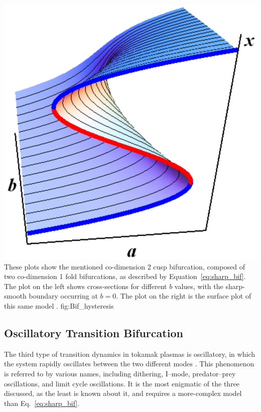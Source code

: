 	{\includegraphics[width=\textwidth]{../Graphics/Bif_Graphs/Bif_3D.png}}
	{These plots show the mentioned co-dimension 2 cusp bifurcation, composed of two co-dimension 1 fold bifurcations, as described by Equation~\ref{eq:sharp_bif}.
	The plot on the left shows cross-sections for different $b$ values, with the sharp-smooth boundary occurring at $b = 0$.
	The plot on the right is the surface plot of this same model \cite{weymiens_bifurcation_2014}.}
	{fig:Bif_hysteresis}

\subsection{Oscillatory Transition Bifurcation}
The third type of transition dynamics in tokamak plasmas is oscillatory, in which the system rapidly oscillates between the two different modes \cite{ryter_survey_2013, zohm_mhd_1995}.
This phenomenon is referred to by various names, including dithering, I--mode, predator--prey oscillations, and limit cycle oscillations.
It is the most enigmatic of the three discussed, as the least is known about it, and requires a more-complex model than Eq.~\ref{eq:sharp_bif}.

